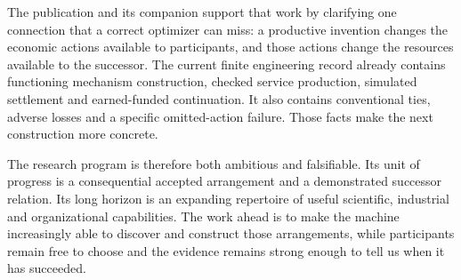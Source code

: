 The publication and its companion support that work by clarifying one connection that a correct optimizer can miss: a productive invention changes the economic actions available to participants, and those actions change the resources available to the successor. The current finite engineering record already contains functioning mechanism construction, checked service production, simulated settlement and earned-funded continuation. It also contains conventional ties, adverse losses and a specific omitted-action failure. Those facts make the next construction more concrete.


The research program is therefore both ambitious and falsifiable. Its unit of progress is a consequential accepted arrangement and a demonstrated successor relation. Its long horizon is an expanding repertoire of useful scientific, industrial and organizational capabilities. The work ahead is to make the machine increasingly able to discover and construct those arrangements, while participants remain free to choose and the evidence remains strong enough to tell us when it has succeeded.
